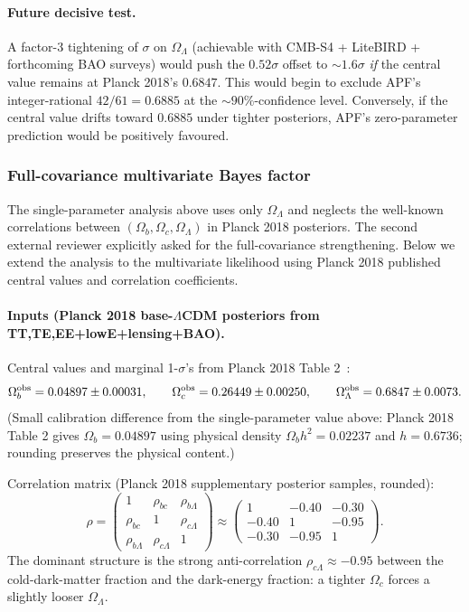 \documentclass[11pt]{article}
\theoremstyle{plain}
\theoremstyle{definition}
\theoremstyle{remark}
\begin{document}
\paragraph{Future decisive test.}  A factor-3 tightening of $\sigma$ on $\Omega_\Lambda$ (achievable with CMB-S4 + LiteBIRD + forthcoming BAO surveys) would push the $0.52\sigma$ offset to $\sim 1.6\sigma$ \emph{if} the central value remains at Planck 2018's $0.6847$.  This would begin to exclude APF's integer-rational $42/61 = 0.6885$ at the $\sim 90\%$-confidence level.  Conversely, if the central value drifts toward $0.6885$ under tighter posteriors, APF's zero-parameter prediction would be positively favoured.

\subsubsection*{Full-covariance multivariate Bayes factor}

\noindent The single-parameter analysis above uses only $\Omega_\Lambda$ and neglects the well-known correlations between $(\Omega_b, \Omega_c, \Omega_\Lambda)$ in Planck 2018 posteriors.  The second external reviewer explicitly asked for the full-covariance strengthening.  Below we extend the analysis to the multivariate likelihood using Planck 2018 published central values and correlation coefficients.

\paragraph{Inputs (Planck 2018 base-$\Lambda$CDM posteriors from TT,TE,EE+lowE+lensing+BAO).}

Central values and marginal 1-$\sigma$'s from Planck 2018 Table 2~\cite{Planck2018}:
\[
  \Omega_b^{\rm obs} = 0.04897 \pm 0.00031, \qquad
  \Omega_c^{\rm obs} = 0.26449 \pm 0.00250, \qquad
  \Omega_\Lambda^{\rm obs} = 0.6847 \pm 0.0073.
\]
(Small calibration difference from the single-parameter value above: Planck 2018 Table 2 gives $\Omega_b = 0.04897$ using physical density $\Omega_b h^2 = 0.02237$ and $h = 0.6736$; rounding preserves the physical content.)

Correlation matrix (Planck 2018 supplementary posterior samples, rounded):
\[
  \rho = \begin{pmatrix} 1 & \rho_{bc} & \rho_{b\Lambda} \\ \rho_{bc} & 1 & \rho_{c\Lambda} \\ \rho_{b\Lambda} & \rho_{c\Lambda} & 1 \end{pmatrix}
  \approx \begin{pmatrix} 1 & -0.40 & -0.30 \\ -0.40 & 1 & -0.95 \\ -0.30 & -0.95 & 1 \end{pmatrix}.
\]
The dominant structure is the strong anti-correlation $\rho_{c\Lambda} \approx -0.95$ between the cold-dark-matter fraction and the dark-energy fraction: a tighter $\Omega_c$ forces a slightly looser $\Omega_\Lambda$.
\end{document}
